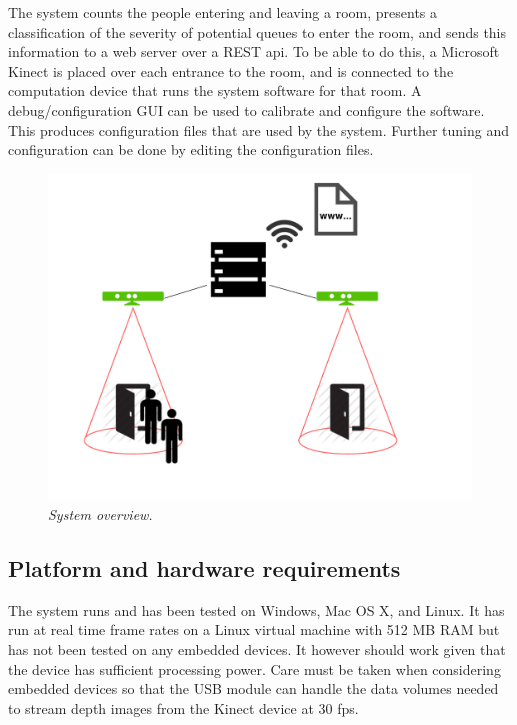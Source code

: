 The system counts the people entering and leaving a room, presents a classification of the severity of potential queues to enter the room, and sends this information to a web server over a REST api. To be able to do this, a Microsoft Kinect is placed over each entrance to the room, and is connected to the computation device that runs the system software for that room. A debug/configuration GUI can be used to calibrate and configure the software. This produces configuration files that are used by the system. Further tuning and configuration can be done by editing the configuration files. 

\begin{figure}[htb]
	\centering
	\includegraphics[width=\linewidth]{images/system_overview.pdf}
	\caption[Overview of the entire system]{\textit{System overview.}}
	\label{fig:system_overview}  %
\end{figure}

\subsection{Platform and hardware requirements}
The system runs and has been tested on Windows, Mac OS X, and Linux. It has  run at real time frame rates on a Linux virtual machine with 512 MB RAM but has not been tested on any embedded devices. It however should work given that the device has sufficient processing power. Care must be taken when considering embedded devices so that the USB module can handle the data volumes needed to stream depth images from the Kinect device at 30 fps. 

